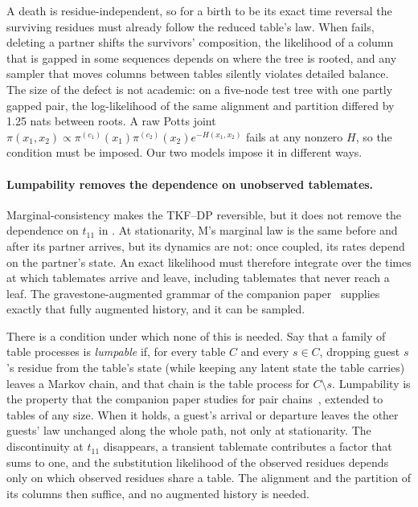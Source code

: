 \documentclass[11pt]{article}
\newcommand{\eqm}{\pi}
\begin{document}
A death is residue-independent, so for a birth to be its exact time reversal
the surviving residues must already follow the reduced table's law. When
 fails, deleting a partner shifts the survivors'
composition, the likelihood of a column that is gapped in some sequences
depends on where the tree is rooted, and any sampler that moves columns
between tables silently violates detailed balance. The size of the defect is
not academic: on a five-node test tree with one partly gapped pair, the
log-likelihood of the same alignment and partition differed by 1.25 nats
between roots. A raw Potts joint
$\eqm(x_1,x_2)\propto\eqm^{(c_1)}(x_1)\eqm^{(c_2)}(x_2)e^{-H(x_1,x_2)}$
fails  at any nonzero $H$, so the condition must be
imposed. Our two models impose it in different ways.

\paragraph{Lumpability removes the dependence on unobserved tablemates.}
Marginal-consistency makes the TKF--DP reversible, but it does not remove
the dependence on $t_{11}$ in . At stationarity, M's
marginal law is the same before and after its partner arrives, but its
dynamics are not: once coupled, its rates depend on the partner's state. An
exact likelihood must therefore integrate over the times at which tablemates
arrive and leave, including tablemates that never reach a leaf. The
gravestone-augmented grammar of the companion paper~\citep{HolmesLarge2026BW}
supplies exactly that fully augmented history, and it can be sampled.

There is a condition under which none of this is needed. Say that a family of
table processes is \emph{lumpable} if, for every table $C$ and every
$s\in C$, dropping guest $s$'s residue from the table's state (while keeping
any latent state the table carries) leaves a Markov chain, and that chain is
the table process for $C\setminus s$. Lumpability is
the property that the companion paper studies for pair
chains~\citep{LargeHolmes2026Coupled}, extended to tables of any size. When it
holds, a guest's arrival or departure leaves the other guests' law unchanged
along the whole path, not only at stationarity. The discontinuity at
$t_{11}$ disappears, a transient tablemate contributes a factor that sums to
one, and the substitution likelihood of the observed residues depends only on
which observed residues share a table. The alignment and the partition of its
columns then suffice, and no augmented history is needed.
\end{document}
